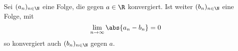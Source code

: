 \begin{exercise}
  Sei $(a_n)_{n \in \N}$ eine Folge, die gegen $a \in \R$ konvergiert. Ist
  weiter $(b_n)_{n \in \N}$ eine Folge, mit
  \[
    \lim_{n \to \infty} \abs{a_n - b_n} = 0
  \]
  so konvergiert auch $(b_n)_{n \in \N}$ gegen $a$.
\end{exercise}
